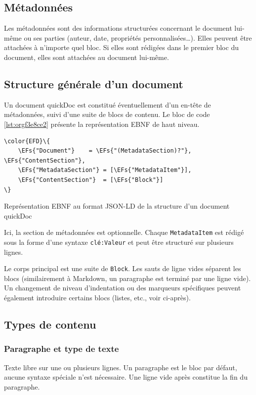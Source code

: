 \documentclass[a4paper,12pt]{article}
\def\textcolor#1#2{#2}%
\newcommand{\EFs}[1]{\textcolor{EFs}{#1}} %
\begin{document}
\subsection{Métadonnées}
\label{sec:org746868e}
Les métadonnées sont des informations structurées concernant le document lui-même ou ses parties (auteur, date, propriétés personnalisées…).
Elles peuvent être attachées à n'importe quel bloc. Si elles sont rédigées dans le premier bloc du document, elles sont attachées au document lui-même.
\subsection{Structure générale d’un document}
\label{sec:org4a209ab}

Un document quickDoc est constitué éventuellement d’un en-tête de métadonnées, suivi d’une suite de blocs de contenu. Le bloc de code \ref{lst:orgf3e8ce2} présente la représentation EBNF de haut niveau.

\begin{listing}[htbp]
\begin{Code}
\begin{Verbatim}
\color{EFD}\{
    \EFs{"Document"}    = \EFs{"(MetadataSection)?"}, \EFs{"ContentSection"},
    \EFs{"MetadataSection"} = [\EFs{"MetadataItem"}],
    \EFs{"ContentSection"}  = [\EFs{"Block"}]
\}
\end{Verbatim}
\end{Code}
\caption{\label{lst:orgf3e8ce2}Représentation EBNF au format JSON-LD de la structure d'un document quickDoc}
\end{listing}

Ici, la section de métadonnées est optionnelle. Chaque \texttt{MetadataItem} est rédigé sous la forme d'une syntaxe \texttt{clé:Valeur} et peut être structuré sur plusieurs lignes.

Le corps principal est une suite de \texttt{Block}. Les sauts de ligne vides séparent les blocs (similairement à Markdown, un paragraphe est terminé par une ligne vide). Un changement de niveau d’indentation ou des marqueurs spécifiques peuvent également introduire certains blocs (listes, etc., voir ci-après).
\subsection{Types de contenu}
\label{sec:orgdbe457f}
\subsubsection{Paragraphe et type de texte}
\label{sec:orgee3362f}
Texte libre sur une ou plusieurs lignes. Un paragraphe est le bloc par défaut, aucune syntaxe spéciale n’est nécessaire. Une ligne vide après constitue la fin du paragraphe.
\end{document}
